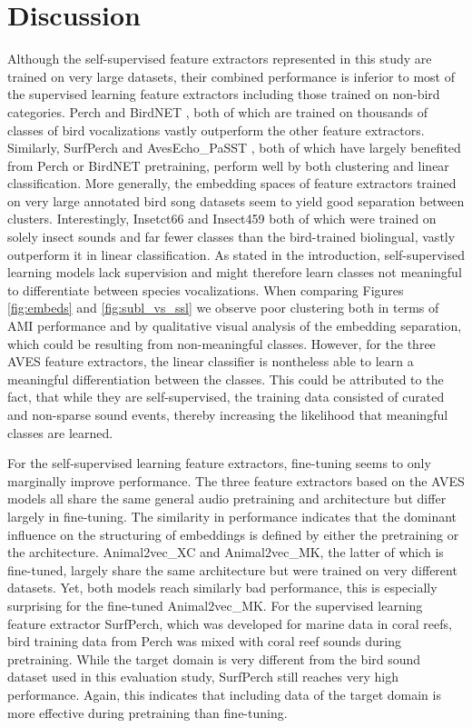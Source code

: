 \section{Discussion}
\label{sec:discussion}

Although the self-supervised feature extractors represented in this study are trained on very large datasets, their combined performance is inferior to most of the supervised learning feature extractors including those trained on non-bird categories.
Perch and BirdNET \cite{kahl_birdnet_2021}, both of which are trained on thousands of classes of bird vocalizations vastly outperform the other feature extractors. 
Similarly, SurfPerch \cite{williams_leveraging_2024} and AvesEcho\_PaSST \cite{ghani_generalization_2024}, both of which have largely benefited from Perch or BirdNET pretraining, perform well by both clustering and linear classification.
More generally, the embedding spaces of feature extractors trained on very large annotated bird song datasets seem to yield good separation between clusters.
Interestingly, Insetct66 and Insect459 both of which were trained on solely insect sounds and far fewer classes than the bird-trained biolingual, vastly outperform it in linear classification.
As stated in the introduction, self-supervised learning models lack supervision and might therefore learn classes not meaningful to differentiate between species vocalizations.
When comparing Figures \ref{fig:embeds} and \ref{fig:subl_vs_ssl} we observe poor clustering both in terms of AMI performance and by qualitative visual analysis of the embedding separation, which could be resulting from non-meaningful classes.
However, for the three AVES feature extractors, the linear classifier is nontheless able to learn a meaningful differentiation between the classes.
This could be attributed to the fact, that while they are self-supervised, the training data consisted of curated and non-sparse sound events, thereby increasing the likelihood that meaningful classes are learned.

For the self-supervised learning feature extractors, fine-tuning seems to only marginally improve performance.
The three feature extractors based on the AVES models all share the same general audio pretraining and architecture but differ largely in fine-tuning. 
The similarity in performance indicates that the dominant influence on the structuring of embeddings is defined by either the pretraining or the architecture.
Animal2vec\_XC and Animal2vec\_MK, the latter of which is fine-tuned, largely share the same architecture but were trained on very different datasets.
Yet, both models reach similarly bad performance, this is especially surprising for the fine-tuned Animal2vec\_MK.
For the supervised learning feature extractor SurfPerch, which was developed for marine data in coral reefs, bird training data from Perch was mixed with coral reef sounds during pretraining.
While the target domain is very different from the bird sound dataset used in this evaluation study, SurfPerch still reaches very high performance.
Again, this indicates that including data of the target domain is more effective during pretraining than fine-tuning.

